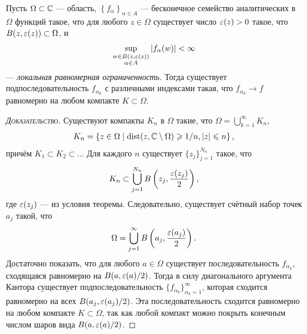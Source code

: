 \documentclass[../complex-analysis.tex]{subfiles}
\begin{document}
\begin{thm}[Монтеля]
Пусть $ \Omega \subset \mathbb{C} $ --- область, $ \left\{f_{\alpha}\right\}_{\alpha \in A}  $ --- бесконечное семейство аналитических в $ \Omega $ функций такое, что для любого $ z \in \Omega $ существует число $ \varepsilon(z) > 0 $ такое, что $ B(z, \varepsilon(z)) \subset \Omega $, и \begin{align*}
  \sup_{\substack{w \in B(z, \varepsilon(z)) \\ \alpha \in A}} \left| f_\alpha(w) \right| < \infty
 \end{align*} --- \textit{локальная равномерная ограниченность.} Тогда существует подпоследовательность $ f_{\alpha_k} $ с различными индексами такая, что $f_{\alpha_k} \to f$ равномерно на любом компакте $ K \subset \Omega $.
\end{thm}
\begin{proof}[\normalfont\textsc{Доказательство}]
 Существуют компакты $ K_n $ в $ \Omega $ такие, что $ \Omega = \bigcup_{k=1}^{\infty} K_n $,
 \begin{align*}
  K_n = \left\{ z \in \Omega \mid \mathrm{dist}(z, \mathbb{C} \setminus \Omega) \geqslant 1 / n, \left| z \right| \leqslant n \right\},
 \end{align*} причём $ K_1 \subset K_2 \subset \ldots $ Для каждого $ n $ существует $ \{z_{j}\}_{j=1}^{N_n}   $ такое, что
 \begin{align*}
	 K_n \subset \bigcup_{j=1}^{N_n} B\left(z_j, \frac{\varepsilon(z_j)}{2}\right),
 \end{align*} где $ \varepsilon(z_j) $ --- из условия теоремы. Следовательно, существует счётный набор точек $ a_j $ такой, что
 \begin{align*}
	\Omega = \bigcup_{j=1}^{\infty} B\left(a_j, \frac{\varepsilon(a_j)}{2}\right).
 \end{align*} Достаточно показать, что для любого $ a \in \Omega $ существует последовательность $ f_{\alpha_k} $, сходящаяся равномерно на  $ B(a, \varepsilon(a) / 2) $. Тогда в силу диагонального аргумента Кантора существует подпоследовательность  $ \{f_{\alpha_k}\}_{\alpha_k=1}^{\infty}   $, которая сходится равномерно на всех $ B(a_j, \varepsilon(a_j) / 2) $. Эта последовательность сходится равномерно на любом компакте $ K \subset \Omega $, так как любой компакт можно покрыть конечным числом шаров вида $ B(a, \varepsilon(a) / 2) $.


\end{proof}
\end{document}
